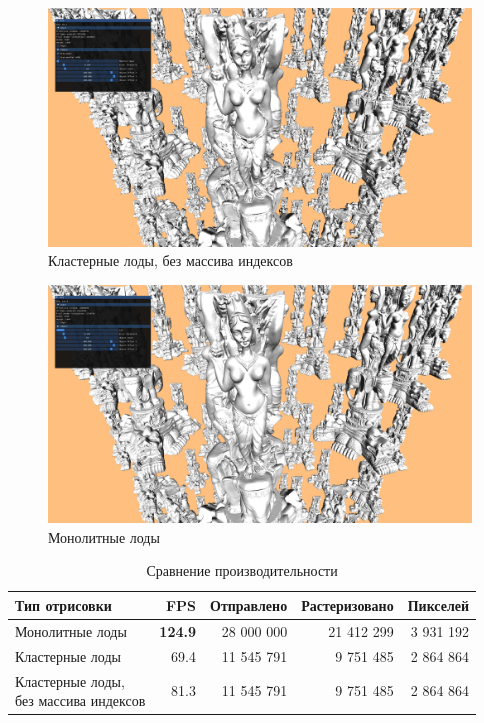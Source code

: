 \begin{figure}[ht]
    \centering
    \includegraphics[width=\textwidth]{pics/impl2.png}
    \caption{Кластерные лоды, без массива индексов}
    \label{fig:impl-cluster-2}
\end{figure}

\begin{figure}[ht]
    \centering
    \includegraphics[width=\textwidth]{pics/impl3.png}
    \caption{Монолитные лоды}
    \label{fig:impl-mono}
\end{figure}

\begin{table}[h]
    \centering
    \begin{tabular}{lrrrr}
        \hline \hline
        Тип отрисовки
        & FPS
        & Отправлено
        & Растеризовано
        & Пикселей \\ \hline
        Монолитные лоды
        & \textbf{124.9}
        & 28 000 000
        & 21 412 299
        & 3 931 192 \\
        Кластерные лоды
        & 69.4
        & 11 545 791
        & 9 751 485
        & 2 864 864 \\
        \makecell[l]{Кластерные лоды,\\ без массива индексов}
        & 81.3
        & 11 545 791
        & 9 751 485
        & 2 864 864 \\
        \hline \hline
    \end{tabular}

    \caption{Сравнение производительности}
    \label{tab:fps}
\end{table}

